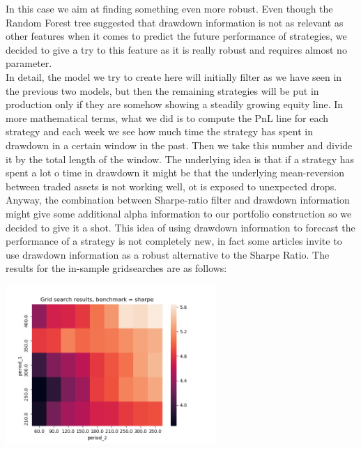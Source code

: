 In this case we aim at finding something even more robust. Even though the Random Forest tree suggested that drawdown information is not as relevant as other features when it comes to predict the future performance of strategies, we decided to give a try to this feature as it is really robust and requires almost no parameter.\\
In detail, the model we try to create here will initially filter as we have seen in the previous two models, but then the remaining strategies will be put in production only if they are somehow showing a steadily growing equity line. In more mathematical terms, what we did is to compute the PnL line for each strategy and each week we see how much time the strategy has spent in drawdown in a certain window in the past. Then we take this number and divide it by the total length of the window. The underlying idea is that if a strategy has spent a lot o time in drawdown it might be that the underlying mean-reversion between traded assets is not working well, ot is exposed to unexpected drops. Anyway, the combination between Sharpe-ratio filter and drawdown information might give some additional alpha information to our portfolio construction so we decided to give it a shot. This idea of using drawdown information to forecast the performance of a strategy is not completely new, in fact some articles \cite{challet} invite to use drawdown information as a robust alternative to the Sharpe Ratio. The results for the in-sample gridsearches are as follows: 

\begin{center}
	\centering
	\includegraphics[width=0.6\textwidth]{GridSearches/Average_Drawdown/Figure_1.png}
	\label{Average_Drawdown_1}
\end{center}

